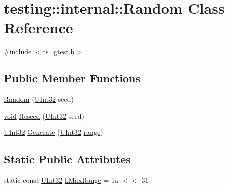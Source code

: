 \hypertarget{classtesting_1_1internal_1_1Random}{\section{testing\-:\-:internal\-:\-:Random Class Reference}
\label{classtesting_1_1internal_1_1Random}
}


{\ttfamily \#include $<$ts\-\_\-gtest.\-h$>$}

\subsection*{Public Member Functions}
\begin{DoxyCompactItemize}
\item 
\hyperlink{classtesting_1_1internal_1_1Random_a6e112be5e7cce00551f6383025f69460}{Random} (\hyperlink{namespacetesting_1_1internal_a40d4fffcd2bf56f18b1c380615aa85e3}{U\-Int32} seed)
\item 
\hyperlink{legacy_8hpp_a8bb47f092d473522721002c86c13b94e}{void} \hyperlink{classtesting_1_1internal_1_1Random_adf2f24199318a46f885c78f50d89a69e}{Reseed} (\hyperlink{namespacetesting_1_1internal_a40d4fffcd2bf56f18b1c380615aa85e3}{U\-Int32} seed)
\item 
\hyperlink{namespacetesting_1_1internal_a40d4fffcd2bf56f18b1c380615aa85e3}{U\-Int32} \hyperlink{classtesting_1_1internal_1_1Random_a9315b7fb621cbcfdf92ed4b5e584c0db}{Generate} (\hyperlink{namespacetesting_1_1internal_a40d4fffcd2bf56f18b1c380615aa85e3}{U\-Int32} \hyperlink{imgproc__c_8h_a7e12f6e5472cdb21ec13ab5365ffd987}{range})
\end{DoxyCompactItemize}
\subsection*{Static Public Attributes}
\begin{DoxyCompactItemize}
\item 
static const \hyperlink{namespacetesting_1_1internal_a40d4fffcd2bf56f18b1c380615aa85e3}{U\-Int32} \hyperlink{classtesting_1_1internal_1_1Random_a36d72dd7063d0b5338f229e75382fdd2}{k\-Max\-Range} = 1u $<$$<$ 31
\end{DoxyCompactItemize}


